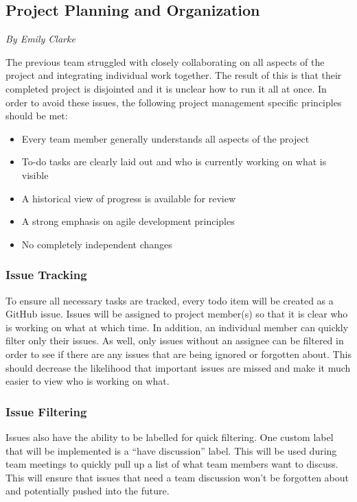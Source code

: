\documentclass[12pt]{report}
\newcommand{\sectionAuthor}[1]{{\small\vspace{-1em}\textit{#1}}\bigskip\par}
\begin{document}
\subsection{Project Planning and Organization}
\sectionAuthor{By Emily Clarke}
The previous team struggled with closely collaborating on all aspects of the project and integrating individual work together. The result of this is that their completed project is disjointed and it is unclear how to run it all at once. In order to avoid these issues, the following project management specific principles should be met:
\begin{itemize}
\itemsep0em 
    \item Every team member generally understands all aspects of the project
    \item To-do tasks are clearly laid out and who is currently working on what is visible
    \item A historical view of progress is available for review
    \item A strong emphasis on agile development principles
    \item No completely independent changes
\end{itemize}
\subsubsection{Issue Tracking}
To ensure all necessary tasks are tracked, every todo item will be created as a GitHub issue. Issues will be assigned to project member(s) so that it is clear who is working on what at which time. In addition, an individual member can quickly filter only their issues. As well, only issues without an assignee can be filtered in order to see if there are any issues that are being ignored or forgotten about. This should decrease the likelihood that important issues are missed and make it much easier to view who is working on what.
\subsubsection{Issue Filtering}
Issues also have the ability to be labelled for quick filtering. One custom label that will be implemented is a “have discussion” label. This will be used during team meetings to quickly pull up a list of what team members want to discuss. This will ensure that issues that need a team discussion won’t be forgotten about and potentially pushed into the future.
\end{document}
